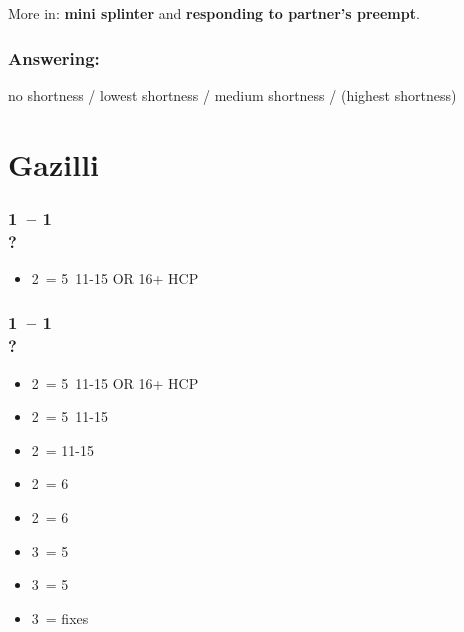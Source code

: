 More in: \textbf{mini splinter} and \textbf{responding to partner's preempt}.

\subsubsection*{Answering:}

no shortness / lowest shortness / medium shortness / (highest shortness)

\section{\texorpdfstring{Gazilli}{gazilli}}\label{sec:gazilli}

\subsubsection*{1\hearts\ -- 1\spades\ \\ ?}
\begin{itemize}
    \item 2\clubs\ = 5\hearts\clubs\ 11-15 OR 16+ HCP \fonce
\end{itemize}

\subsubsection*{1\hearts\ -- 1\ntx\ \\ ?}
\begin{itemize}
    \item 2\clubs\ = 5\hearts\clubs\ 11-15 OR 16+ HCP \fonce
    \item 2\diams\ = 5\diams\ 11-15
    \item 2\hearts\ = 11-15
    \item 2\spades\ = 6\spades\ \gf
    \item 2\ntx\ = 6\minor\ \gf
    \item 3\clubs\ = 5\clubs\ \gf
    \item 3\diams\ = 5\diams\ \gf
    \item 3\hearts\ = fixes \hearts\ \gf
\end{itemize}

